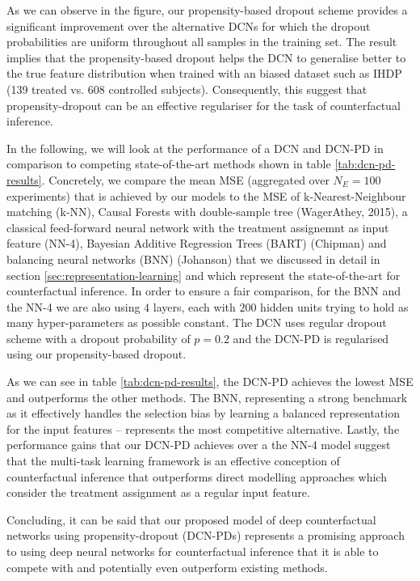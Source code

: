 As we can observe in the figure, our propensity-based dropout scheme provides a significant improvement over the alternative DCNs for which the  dropout probabilities are uniform throughout all samples in the training set. The result implies that the propensity-based dropout helps the DCN to generalise better to the true feature distribution when trained with an biased dataset such as IHDP (139 treated vs. 608 controlled subjects). Consequently, this suggest that propensity-dropout can be an effective regulariser for the task of counterfactual inference. 

In the following, we will look at the performance of a DCN and DCN-PD in comparison to competing state-of-the-art methods shown in table \ref{tab:dcn-pd-results}. Concretely, we compare the mean MSE (aggregated over $N_E = 100$ experiments) that is achieved by our models to the MSE of k-Nearest-Neighbour matching (k-NN), Causal Forests with double-sample tree (WagerAthey, 2015), %
a classical feed-forward neural network with the treatment assignemnt as input feature (NN-4),
Bayesian Additive Regression Trees (BART) (Chipman) %
and balancing neural networks (BNN) (Johanson) %
that we discussed in detail in section \ref{sec:representation-learning} and which represent the state-of-the-art for counterfactual inference. 
In order to ensure a fair comparison, for the BNN and the NN-4 we are also using $4$ layers, each with $200$ hidden units trying to hold as many hyper-parameters as possible constant. The DCN uses regular dropout scheme with a dropout probability of $p=0.2$ and the DCN-PD is regularised using our propensity-based dropout.

As we can see in table \ref{tab:dcn-pd-results}, the DCN-PD achieves the lowest MSE and outperforms the other methods. The BNN, representing  a strong benchmark as it effectively handles the selection bias by learning a balanced representation for the input features -- represents the most competitive alternative. Lastly, the performance gains that our DCN-PD achieves over a the NN-4 model suggest that the multi-task learning framework is an effective conception of counterfactual inference that outperforms direct modelling approaches which consider the treatment assignment as a regular input feature.   %

Concluding, it can be said that our proposed model of deep counterfactual networks using propensity-dropout (DCN-PDs) represents a promising approach to using deep neural networks for counterfactual inference that it is able to compete with and potentially even outperform existing methods. 

